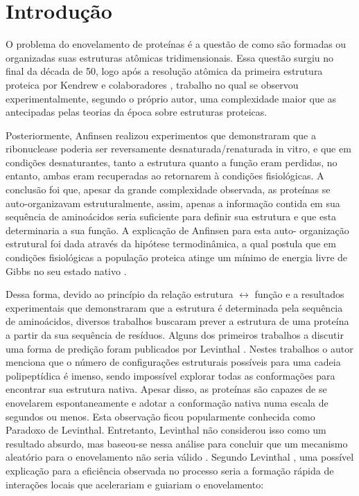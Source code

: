 \chapter{Introdução}\label{ch:introducao}

O problema do enovelamento de proteínas é a questão de como são formadas ou organizadas suas estruturas atômicas tridimensionais. Essa questão surgiu no final da década de 50, logo após a resolução atômica da primeira estrutura proteica por Kendrew e colaboradores \cite{KENDREW:1953}, trabalho no qual se observou experimentalmente, segundo o próprio autor, uma complexidade maior que as antecipadas pelas teorias da época sobre estruturas proteicas. 

Posteriormente, Anfinsen \cite{Anfinsen:1968} realizou experimentos que demonstraram que a ribonuclease poderia ser reversamente desnaturada/renaturada in vitro, e que em condições desnaturantes, tanto a estrutura quanto a função eram perdidas, no entanto, ambas eram recuperadas ao retornarem à condições fisiológicas. A conclusão foi que, apesar da grande complexidade observada, as proteínas se auto-organizavam estruturalmente, assim, apenas a informação contida em sua sequência de aminoácidos seria suficiente para definir sua estrutura e que esta determinaria a sua função. A explicação de Anfinsen para esta auto- organização estrutural foi dada através da hipótese termodinâmica, a qual postula que em condições fisiológicas a população proteica atinge um mínimo de energia livre de Gibbs no seu estado nativo \cite{Rose:2001}.

Dessa forma, devido ao princípio da relação estrutura $\leftrightarrow$ função e a resultados experimentais que demonstraram que a estrutura é determinada pela sequência de aminoácidos, diversos trabalhos buscaram prever a estrutura de uma proteína a partir da sua sequência de resíduos. Alguns dos primeiros trabalhos a discutir uma forma de predição foram publicados por Levinthal \cite{Levinthal:1963, Levinthal:}. Nestes trabalhos o autor menciona que o número de configurações estruturais possíveis para uma cadeia polipeptídica é imenso, sendo impossível explorar todas as conformações para encontrar sua estrutura nativa. Apesar disso, as proteínas são capazes de se enovelarem espontaneamente e adotar a conformação nativa numa escala de segundos ou menos. Esta observação ficou popularmente conhecida como Paradoxo de Levinthal. Entretanto, Levinthal não considerou isso como um resultado absurdo, mas baseou-se nessa análise para concluir que um mecanismo aleatório para o enovelamento não seria válido \cite{Ben-Naim:2007}. Segundo Levinthal \cite{Levinthal:}, uma possível explicação para a eficiência observada no processo seria a formação rápida de interações locais que acelerariam e guiariam o enovelamento:

